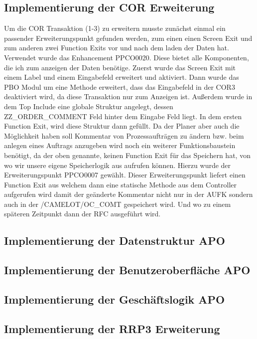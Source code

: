 \subsection{Implementierung der COR Erweiterung}
\label{sec:Implementierung der COR Erweiterung}   
Um die COR Transaktion (1-3) zu erweitern musste zunächst einmal ein passender Erweiterungspunkt gefunden werden, zum einen einen Screen Exit und zum anderen zwei Function Exits vor und nach dem laden der Daten hat. Verwendet wurde das Enhancement PPCO0020. Diese bietet alle Komponenten, die ich zum anzeigen der Daten benötige. Zuerst wurde das Screen Exit mit einem Label und einem Eingabefeld erweitert und aktiviert. Dann wurde das PBO Modul um eine Methode erweitert, dass das Eingabefeld in der COR3 deaktiviert wird, da diese Transaktion nur zum Anzeigen ist. Außerdem wurde in dem Top Include eine globale Struktur angelegt, dessen ZZ\_ORDER\_COMMENT Feld hinter dem Eingabe Feld liegt. In dem ersten Function Exit, wird diese Struktur dann gefüllt. Da der Planer aber auch die Möglichkeit haben soll Kommentar von Prozessaufträgen zu ändern bzw. beim anlegen eines Auftrags anzugeben wird noch ein weiterer Funktionsbaustein benötigt, da der oben genannte, keinen Function Exit für das Speichern hat, von wo wir unsere eigene Speicherlogik aus aufrufen können. Hierzu wurde der Erweiterungspunkt PPCO0007 gewählt. Dieser Erweiterungspunkt liefert einen Function Exit aus welchem dann eine statische Methode aus dem Controller aufgerufen wird damit der geänderte Kommentar nicht nur in der AUFK sondern auch in der /CAMELOT/OC\_COMT gespeichert wird. Und wo zu einem späteren Zeitpunkt dann der RFC ausgeführt wird.

\subsection{Implementierung der Datenstruktur APO}
\label{sec:Implementierung der Datenstruktur APO} 

\subsection{Implementierung der Benutzeroberfläche APO}
\label{sec:Implementierung der Benutzeroberfläche APO}  

\subsection{Implementierung der Geschäftslogik APO}
\label{sec:Implementierung der Geschäftslogik APO}  

\subsection{Implementierung der RRP3 Erweiterung}
\label{sec:Implementierung der RRP3 Erweiterung}   


